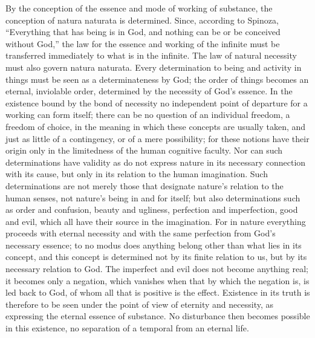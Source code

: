 By the conception of the essence and mode of working of substance, the
conception of natura naturata is determined. Since, according to
Spinoza, ``Everything that has being is in God, and nothing can be or
be conceived without God,'' the law for the essence and working of the
infinite must be transferred immediately to what is in the infinite.
The law of natural necessity must also govern natura
naturata. Every determination to being and activity in
things must be seen as a determinateness by God; the order of things
becomes an eternal, inviolable order, determined by the necessity of
God's essence. In the existence bound by the bond of necessity no
independent point of departure for a working can form itself; there
can be no question of an individual freedom, a freedom of choice, in
the meaning in which these concepts are usually taken, and just as
little of a contingency, or of a mere possibility; for these notions
have their origin only in the limitedness of the human cognitive
faculty. Nor can such determinations have validity as do not express
nature in its necessary connection with its cause, but only in its
relation to the human imagination.
Such determinations are not merely those that designate nature's
relation to the human senses, not nature's being in and for itself;
but also determinations such as order and confusion, beauty and
ugliness, perfection and imperfection, good and evil, which all have
their source in the imagination. For in nature everything proceeds
with eternal necessity and with the same perfection from God's
necessary essence; to no modus does anything belong other than what
lies in its concept, and this concept is determined not by its finite
relation to us, but by its necessary relation to God. The imperfect
and evil does not become anything real; it becomes only a negation,
which vanishes when that by which the negation is, is led back to God,
of whom all that is positive is the effect. Existence in its truth is
therefore to be seen under the point of view of eternity and
necessity, as expressing the eternal essence of substance. No
disturbance then becomes possible in this existence, no separation of
a temporal from an eternal life.

